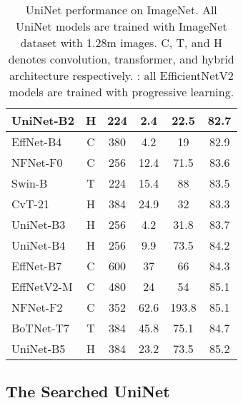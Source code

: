 \documentclass{article} \usepackage{iclr2022_conference,times}
\begin{document}
\begin{table}[t]
\begin{tabular}{lc|ccc|c}
    \rowcolor{LightCyan}
    UniNet-B2 & H     & 224   & 2.4   & 22.5  & 82.7  \\
    \midrule
    EffNet-B4 \citep{efficientnet} & C     & 380   & 4.2   & 19    & 82.9 \\
    NFNet-F0 \citep{nfnet} & C     & 256   & 12.4  & 71.5  & 83.6 \\
Swin-B \citep{swin} & T     & 224   & 15.4  & 88    & 83.5 \\
    CvT-21 \citep{cvt} & H     & 384   & 24.9  & 32    & 83.3 \\
    \rowcolor{LightCyan}
    UniNet-B3 & H     & 256   & 4.2   & 31.8  & 83.7 \\
    \rowcolor{LightCyan}
    UniNet-B4 & H     & 256   & 9.9   & 73.5  & 84.2 \\
    \midrule
    EffNet-B7 \citep{efficientnet} & C     & 600   & 37    & 66    & 84.3 \\
    EffNetV2-M\textsuperscript{} \citep{effnetv2} & C     & 480   & 24    & 54    & 85.1 \\
    NFNet-F2 \citep{nfnet} & C     & 352   & 62.6  & 193.8 & 85.1 \\
    BoTNet-T7 \citep{botnet} & T     & 384   & 45.8  & 75.1  & 84.7 \\
    \rowcolor{LightCyan}
    UniNet-B5 & H     & 384   & 23.2  & 73.5  & 85.2 \\
    \bottomrule
  \end{tabular}\vspace{-1em}
  \caption{UniNet performance on ImageNet. All UniNet models are trained with ImageNet dataset with 1.28m images. C, T, and H denotes convolution, transformer, and hybrid architecture respectively. : all EfficientNetV2 models are trained with progressive learning.}
  \label{tab:sota}\vspace{-1.8em}
\end{table}

\subsection{The Searched UniNet}
\end{document}
